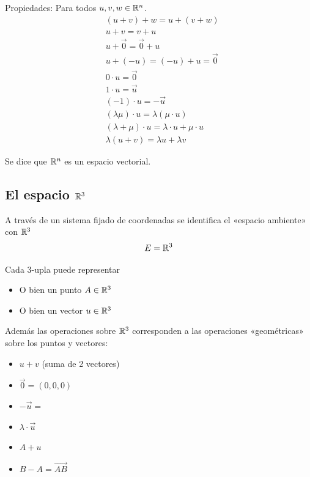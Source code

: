 \documentclass[11pt,a4paper]{article}
\begin{document}
Propiedades: Para todos $u,v,w\in\mathbb{R}^n$.
\begin{align*}
&(u+v)+w=u+(v+w)\\
&u+v=v+u\\
&u+\vec0=\vec0+u\\
&u+(-u)=(-u)+u=\vec0\\
&0\cdot u=\vec0\\
&1\cdot u=\vec u\\
&(-1)\cdot u=-\vec u\\
&(\lambda\mu)\cdot u=\lambda(\mu\cdot u)\\
&(\lambda+\mu)\cdot u=\lambda\cdot u+\mu\cdot u\\
&\lambda(u+v)=\lambda u+\lambda v
\end{align*}

Se dice que $\mathbb{R}^n$ es un espacio vectorial.

\subsection{\texorpdfstring{El espacio $\mathbb{R}^3$}{El espacio R3}}

A través de un sistema fijado de coordenadas se identifica el «espacio ambiente» con $\mathbb{R}^3$
\[
E=\mathbb{R}^3
\]

\begin{observacion}
Cada 3-upla puede representar
\begin{itemize}
  \item O bien un punto $A\in\mathbb{R}^3$
  \item O bien un vector $u\in\mathbb{R}^3$
\end{itemize}
\end{observacion}

Además las operaciones sobre $\mathbb{R}^3$ corresponden a las operaciones «geométricas» sobre los puntos y vectores:
\begin{itemize}
  \item $u+v$ (suma de 2 vectores)
  \item $\vec0=(0,0,0)$
  \item $-\vec u=$ %
  \item $\lambda\cdot\vec u$
  \item $A+u$
  \item $B-A=\overrightarrow{AB}$
\end{itemize}

\begin{center}
\end{center}
\end{document}
